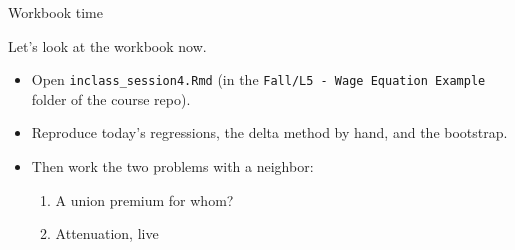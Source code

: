 \documentclass[aspectratio=169,11pt]{beamer}
\begin{document}
\begin{frame}{Workbook time}
\begin{center}
{\LARGE \alert{Let's look at the workbook now.}}
\end{center}
\bigskip
\begin{itemize}
	\item Open \texttt{inclass\_session4.Rmd} (in the \texttt{Fall/L5 - Wage Equation Example} folder of the course repo).
	\item Reproduce today's regressions, the delta method by hand, and the bootstrap.
	\item Then work the two problems with a neighbor:
	\begin{enumerate}
		\item A union premium for whom?
		\item Attenuation, live
	\end{enumerate}
\end{itemize}
\end{frame}
\end{document}

